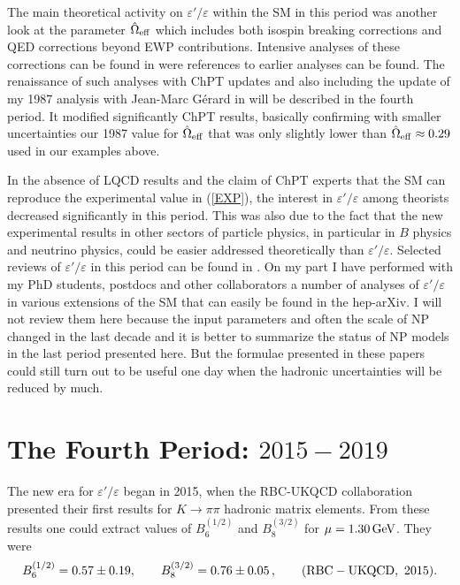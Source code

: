 \documentclass[12pt,a4paper]{article}
\newcommand{\gev}{\, {\rm GeV}}
\newcommand{\bsi}{B_6^{(1/2)}}
\newcommand{\bei}{B_8^{(3/2)}}
\def\epe{\varepsilon'/\varepsilon}
\newcommand{\be}{\begin{equation}}
\newcommand{\ee}{\end{equation}}
\begin{document}
The main  theoretical activity on $\epe$ within the SM in this period was another look at the parameter $\hat\Omega_{\rm eff}$ which includes both isospin breaking corrections and QED corrections beyond EWP contributions. Intensive analyses of these corrections can be found in \cite{Cirigliano:2003nn,Cirigliano:2003gt,Bijnens:2004ai} were references to earlier analyses can be found. The renaissance of such analyses with ChPT updates and also including the update of
my 1987 analysis with Jean-Marc G{\'e}rard in \cite{Buras:1987wc} will be described in the fourth period. It modified significantly ChPT results, basically
confirming with smaller uncertainties our 1987 value for $\hat\Omega_{\rm eff}$ that was only slightly lower than  $\hat\Omega_{\rm eff}\approx 0.29$ 
used in our examples above.

In the absence of LQCD results and the claim of ChPT experts that the SM
can reproduce the experimental value in (\ref{EXP}), the interest in $\epe$
among theorists decreased significantly in this period. This was also due to the fact that the new experimental results in other sectors of particle physics, in particular in $B$ physics and neutrino physics, could be easier addressed theoretically than $\epe$. Selected reviews of $\epe$ in this period can be found in
\cite{Bertolini:1998vd,Buras:2003zz,Cirigliano:2011ny,Bertolini:2012pu}. 
On my part I have performed with my PhD students, postdocs and other collaborators  a number of analyses of $\epe$ in various extensions of the SM that
can easily be found in the hep-arXiv. I will not review them here because the input parameters and often the scale of NP changed in the last decade and it is
better to summarize the status of NP models in the last period presented here.
But the formulae presented in these papers could still turn out to be useful one day when the  hadronic uncertainties will be reduced by much.
\boldmath
\section{The Fourth Period: $2015-2019$}\label{P4}
\unboldmath
The new era for $\epe$ began in 2015, when the RBC-UKQCD collaboration  \cite{Bai:2015nea,Blum:2015ywa} presented their first results for $K\to\pi\pi$ hadronic matrix 
elements. From these results 
one could extract values of $\bsi$ and $\bei$ for $\mu=1.30\gev$. They 
 were  \cite{Buras:2015yba}
\be\label{B8LAT0}
\bsi=0.57\pm 0.19,\qquad B_8^{(3/2)}=0.76 \pm 0.05\,,\qquad  {\rm (RBC-UKQCD,~2015)}.
\ee
\end{document}
